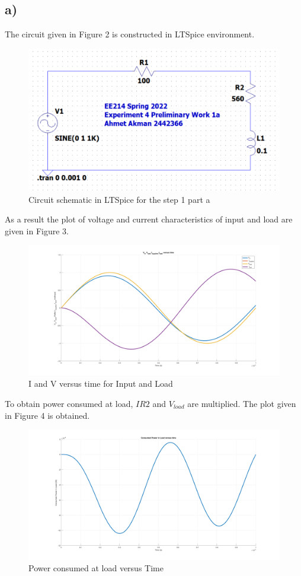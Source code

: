 \documentclass[letterpaper,12pt]{article}
\begin{document}
\subsection{a)}
The circuit given in Figure 2 is constructed in LTSpice environment.
\begin{figure}[H]
    \centering
    \includegraphics[width=1\textwidth]{1aSCH.png}
    \caption{Circuit schematic in LTSpice for the step 1 part a}
\end{figure} 
As a result the plot of voltage and current characteristics of input and load are given in Figure 3.
\begin{figure}[H]
    \centering
    \includegraphics[width=1\textwidth]{1_1.png}
    \caption{I and V versus time for Input and Load}
\end{figure} 
To obtain power consumed at load, \(IR2\) and \(V_{load}\) are multiplied. The plot given in Figure 4 is obtained.
\begin{figure}[H]
    \centering
    \includegraphics[width=1\textwidth]{1_2.png}
    \caption{Power consumed at load versus Time}
\end{figure} 
\end{document}
